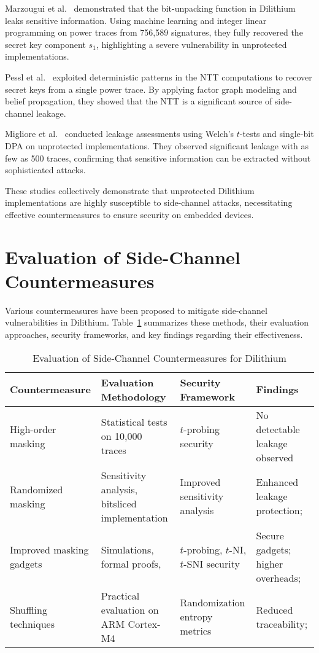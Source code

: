 Marzougui et al.~\cite{Marzougui22} demonstrated that the bit-unpacking function in Dilithium leaks sensitive information. Using machine learning and integer linear programming on power traces from 756,589 signatures, they fully recovered the secret key component $s_1$, highlighting a severe vulnerability in unprotected implementations.

Pessl et al.~\cite{Pessl19} exploited deterministic patterns in the NTT computations to recover secret keys from a single power trace. By applying factor graph modeling and belief propagation, they showed that the NTT is a significant source of side-channel leakage.

Migliore et al.~\cite{Migliore19} conducted leakage assessments using Welch's $t$-tests and single-bit \ac{DPA} on unprotected implementations. They observed significant leakage with as few as 500 traces, confirming that sensitive information can be extracted without sophisticated attacks.

These studies collectively demonstrate that unprotected Dilithium implementations are highly susceptible to side-channel attacks, necessitating effective countermeasures to ensure security on embedded devices.

\section{Evaluation of Side-Channel Countermeasures}

Various countermeasures have been proposed to mitigate side-channel vulnerabilities in Dilithium. Table~\ref{tab:countermeasures} summarizes these methods, their evaluation approaches, security frameworks, and key findings regarding their effectiveness.

\begin{table}[ht]
    \centering
    \renewcommand{\arraystretch}{1.2}
    \caption{Evaluation of Side-Channel Countermeasures for Dilithium}
    \label{tab:countermeasures}
    \begin{tabularx}{\textwidth}{|X|X|X|X|}
        \hline
        \textbf{Countermeasure}                 & \textbf{Evaluation Methodology}                & \textbf{Security Framework}           & \textbf{Findings}                 \\ \hline
        High-order masking \cite{Migliore19}    & Statistical tests on 10,000 traces             & $t$-probing security                  & No detectable leakage observed    \\ \hline
        Randomized masking \cite{Azouaoui22}    & Sensitivity analysis, bitsliced implementation & Improved sensitivity analysis         & Enhanced leakage protection;      \\ \hline
        Improved masking gadgets \cite{Coron23} & Simulations, formal proofs,                    & $t$-probing, $t$-NI, $t$-SNI security & Secure gadgets; higher overheads; \\ \hline
        Shuffling techniques \cite{Ravi20}      & Practical evaluation on ARM Cortex-M4          & Randomization entropy metrics         & Reduced traceability;             \\ \hline
    \end{tabularx}
\end{table}

